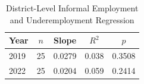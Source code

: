 \begin{table}[htbp]
\caption{District-Level Informal Employment and Underemployment Regression}
\label{tab:district_regression}
\centering
\footnotesize
\begin{tabular}{lcccc}
\toprule
\textbf{Year} & \textbf{$n$} & \textbf{Slope} & \textbf{$R^2$} & \textbf{$p$}\\
\midrule
2019 & 25 & 0.0279 & 0.038 & 0.3508\\
2022 & 25 & 0.0204 & 0.059 & 0.2414\\
\bottomrule
\end{tabular}
\end{table}
